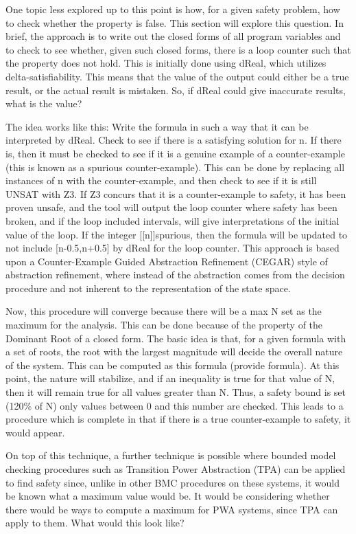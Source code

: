 One topic less explored up to this point is how, for a given safety problem, how to check whether the property is false. This section will explore this question. In brief, the approach is to write out the closed forms of all program variables and to check to see whether, given such closed forms, there is a loop counter such that the property does not hold. This is initially done using dReal, which utilizes delta-satisfiability. This means that the value of the output could either be a true result, or the actual result is mistaken. So, if dReal could give inaccurate results, what is the value?

The idea works like this: Write the formula in such a way that it can be interpreted by dReal. Check to see if there is a satisfying solution for n. If there is, then it must be checked to see if it is a genuine example of a counter-example (this is known as a spurious counter-example). This can be done by replacing all instances of n with the counter-example, and then check to see if it is still UNSAT with Z3. If Z3 concurs that it is a counter-example to safety, it has been proven unsafe, and the tool will output the loop counter where safety has been broken, and if the loop included intervals, will give interpretations of the initial value of the loop. If the integer [[n]]spurious, then the formula will be updated to not include [n-0.5,n+0.5] by dReal for the loop counter. This approach is based upon a Counter-Example Guided Abstraction Refinement (CEGAR) style of abstraction refinement, where instead of the abstraction comes from the decision procedure and not inherent to the representation of the state space.

Now, this procedure will converge because there will be a max N set as the maximum for the analysis. This can be done because of the property of the Dominant Root of a closed form. The basic idea is that, for a given formula with a set of roots, the root with the largest magnitude will decide the overall nature of the system. This can be computed as this formula (provide formula). At this point, the nature will stabilize, and if an inequality is true for that value of N, then it will remain true for all values greater than N. Thus, a safety bound is set (120\% of N) only values between 0 and this number are checked. This leads to a procedure which is complete in that if there is a true counter-example to safety, it would appear.

On top of this technique, a further technique is possible where bounded model checking procedures such as Transition Power Abstraction (TPA) can be applied to find safety since, unlike in other BMC procedures on these systems, it would be known what a maximum value would be. It would be considering whether there would be ways to compute a maximum for PWA systems, since TPA can apply to them. What would this look like?

